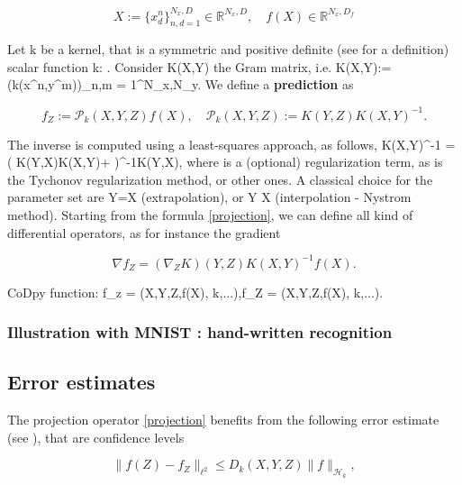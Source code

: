 \documentclass[]{article}
\def\({}%
\def\){}%
\numberwithin{equation}{section}
\newcommand \RR    {\mathbb{R}}
\begin{document}
\begin{equation}\label{X}
X :=\{x^n_d\}_{n,d=1}^{N_x,D} \in \RR^{N_x,D}, \quad f(X) \in \RR^{N_x,D_f}
\end{equation}

Let \(k\) be a kernel, that is a symmetric and positive definite (see
\cite{BTA} for a definition) scalar function
\(k:  \times {} \mapsto {}\). Consider
\(K(X,Y)\) the Gram matrix, i.e.
\(K(X,Y):=(k(x^n,y^m))_{n,m = 1}^{N_x,N_y}\). We define a
\textbf{prediction} as

\begin{equation} \label{projection}
f_Z := \mathcal{P}_{k}(X,Y,Z)f(X), \quad \mathcal{P}_{k}(X,Y,Z) := K(Y,Z) K(X,Y)^{-1}.
\end{equation}

The inverse is computed using a least-squares approach, as follows,
\(K(X,Y)^{-1} = ( K(Y,X)K(X,Y)+ \epsilon)^{-1}K(Y,X)\), where
\(\epsilon\) is a (optional) regularization term, as is the Tychonov
regularization method, or other ones. A classical choice for the
parameter set are \(Y=X\) (extrapolation), or \(Y \subset X\)
(interpolation - Nystrom method). Starting from the formula
\eqref{projection}, we can define all kind of differential operators, as
for instance the gradient

\begin{equation} \label{grad}
\nabla f_Z = (\nabla_Z K)(Y,Z) K(X,Y)^{-1} f(X).
\end{equation}

CoDpy function:
\(f_z = (X,Y,Z,f(X), k,...),\nabla f_Z = (X,Y,Z,f(X), k,...)\).

\subsubsection{Illustration with MNIST : hand-written
recognition}\label{illustration-with-mnist-hand-written-recognition}

\subsection{Error estimates}\label{error-estimates}

The projection operator \eqref{projection} benefits from the following
error estimate (see \cite{PLF-JMM-estimate}), that are confidence levels

\begin{equation} \label{error}
\| f(Z) - f_Z \|_{\ell^2} \le D_k(X,Y,Z) \| f \|_{\mathcal{H}_k},
\end{equation}
\end{document}
